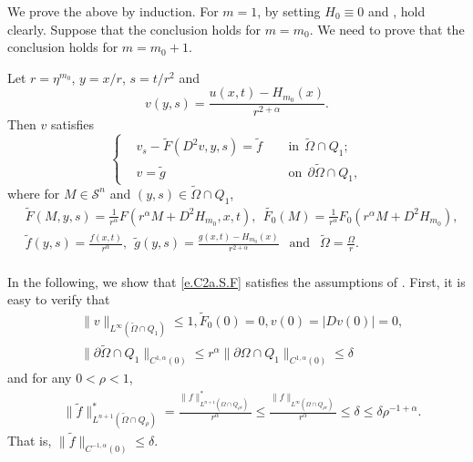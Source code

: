 \documentclass[preprint,12pt]{elsarticle}
\theoremstyle{definition}
\theoremstyle{remark}
\numberwithin{equation}{section}
\begin{document}
We prove the above by induction. For $m=1$, by setting $H_0\equiv 0$ and ,  hold clearly. Suppose that the conclusion holds for $m=m_0$. We need to prove that the conclusion holds for $m=m_0+1$.

Let $r=\eta ^{m_{0}}$, $y=x/r$, $s=t/r^2$ and
\begin{equation}\label{e.C2a.S.v}
  v(y,s)=\frac{u(x,t)-H_{m_0}(x)}{r^{2+\alpha}}.
\end{equation}
Then $v$ satisfies
\begin{equation}\label{e.C2a.S.F}
\left\{\begin{aligned}
&v_s-\tilde{F}(D^2v,y,s)=\tilde{f}&& ~~\mbox{in}~~\tilde{\Omega}\cap Q_1;\\
&v=\tilde{g}&& ~~\mbox{on}~~\partial \tilde{\Omega}\cap Q_1,
\end{aligned}\right.
\end{equation}
where for $M \in \mathcal{S}^{n}$ and $(y,s)\in\tilde{\Omega}\cap Q_1$,
\begin{equation*}\label{e.c2a.S.b}
  \begin{aligned}
&\tilde{F}(M,y,s)=\frac{1}{r^{\alpha}}
F(r^{\alpha}M+D^2 H_{m_0},x,t),~~\tilde{F_0}(M)=\frac{1}{r^{\alpha}}
F_0(r^{\alpha}M+D^2 H_{m_0}),\\
&\tilde{f}(y,s)=\frac{f(x,t)}{r^{\alpha}},~~\tilde{g}(y,s)=\frac{g(x,t)-H_{m_0}(x)}{r^{2+\alpha}}
~~\mbox{ and }~~\tilde{\Omega}=\frac{\Omega}{r}.\\
  \end{aligned}
\end{equation*}

In the following, we show that \cref{e.C2a.S.F} satisfies the assumptions of . First, it is easy to verify that
\begin{equation*}
\begin{aligned}
&\|v\|_{L^{\infty}(\tilde{\Omega}\cap Q_1)}\leq 1, \tilde{F}_0(0)=0, v(0)=|Dv(0)|=0,\\
 &\|\partial \tilde{\Omega}\cap Q_1\|_{C^{1,\alpha}(0)} \leq r^{\alpha}\|\partial\Omega\cap Q_1\|_{C^{1,\alpha}(0)}\leq \delta
\end{aligned}
\end{equation*}
and for any $0<\rho<1$,
\begin{equation*}
\begin{aligned}
&\|\tilde{f}\|^*_{L^{n+1}(\tilde{\Omega}\cap Q_{\rho})}
=\frac{\|f\|^*_{L^{n+1}(\Omega\cap Q_{\rho r})}}{r^{\alpha}}
\leq \frac{\|f\|_{L^{\infty}(\Omega\cap Q_{\rho r})}}{r^{\alpha}}
\leq \delta \leq \delta \rho^{-1+\alpha}.
\end{aligned}
\end{equation*}
That is, $\|\tilde f\|_{C^{-1,\alpha}(0)}\leq \delta$.
\end{document}
